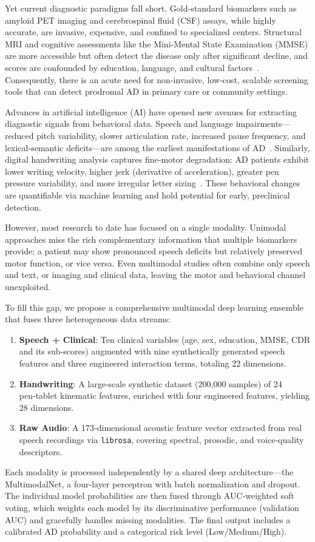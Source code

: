 \documentclass[conference]{IEEEtran}
\begin{document}
Yet current diagnostic paradigms fall short. Gold‑standard biomarkers such as amyloid PET imaging and cerebrospinal fluid (CSF) assays, while highly accurate, are invasive, expensive, and confined to specialized centers. Structural MRI and cognitive assessments like the Mini‑Mental State Examination (MMSE) are more accessible but often detect the disease only after significant decline, and scores are confounded by education, language, and cultural factors~\cite{mueller2005}. Consequently, there is an acute need for non‑invasive, low‑cost, scalable screening tools that can detect prodromal AD in primary care or community settings.

Advances in artificial intelligence (AI) have opened new avenues for extracting diagnostic signals from behavioral data. Speech and language impairments—reduced pitch variability, slower articulation rate, increased pause frequency, and lexical‑semantic deficits—are among the earliest manifestations of AD~\cite{luz2020adress, hoffman2015}. Similarly, digital handwriting analysis captures fine‑motor degradation: AD patients exhibit lower writing velocity, higher jerk (derivative of acceleration), greater pen pressure variability, and more irregular letter sizing~\cite{impedovo2019}. These behavioral changes are quantifiable via machine learning and hold potential for early, preclinical detection.

However, most research to date has focused on a single modality. Unimodal approaches miss the rich complementary information that multiple biomarkers provide; a patient may show pronounced speech deficits but relatively preserved motor function, or vice versa. Even multimodal studies often combine only speech and text, or imaging and clinical data, leaving the motor and behavioral channel unexploited.

To fill this gap, we propose a comprehensive multimodal deep learning ensemble that fuses three heterogeneous data streams:
\begin{enumerate}
    \item \textbf{Speech + Clinical}: Ten clinical variables (age, sex, education, MMSE, CDR and its sub‑scores) augmented with nine synthetically generated speech features and three engineered interaction terms, totaling 22 dimensions.
    \item \textbf{Handwriting}: A large‑scale synthetic dataset (200,000 samples) of 24 pen‑tablet kinematic features, enriched with four engineered features, yielding 28 dimensions.
    \item \textbf{Raw Audio}: A 173‑dimensional acoustic feature vector extracted from real speech recordings via \texttt{librosa}, covering spectral, prosodic, and voice‑quality descriptors.
\end{enumerate}
Each modality is processed independently by a shared deep architecture—the MultimodalNet, a four‑layer perceptron with batch normalization and dropout. The individual model probabilities are then fused through AUC‑weighted soft voting, which weights each model by its discriminative performance (validation AUC) and gracefully handles missing modalities. The final output includes a calibrated AD probability and a categorical risk level (Low/Medium/High).
\end{document}
